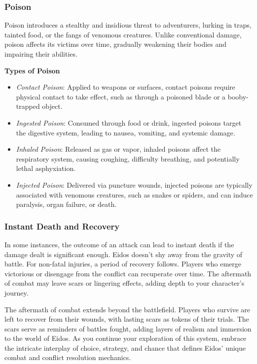 \hypertarget{poison}{%
\subsubsection{Poison}\label{poison}}

Poison introduces a stealthy and insidious threat to adventurers,
lurking in traps, tainted food, or the fangs of venomous creatures.
Unlike conventional damage, poison affects its victims over time,
gradually weakening their bodies and impairing their abilities.

\textbf{Types of Poison}

\begin{itemize}
\tightlist
\item
  \emph{Contact Poison}: Applied to weapons or surfaces, contact poisons
  require physical contact to take effect, such as through a poisoned
  blade or a booby-trapped object.
\item
  \emph{Ingested Poison}: Consumed through food or drink, ingested
  poisons target the digestive system, leading to nausea, vomiting, and
  systemic damage.
\item
  \emph{Inhaled Poison}: Released as gas or vapor, inhaled poisons
  affect the respiratory system, causing coughing, difficulty breathing,
  and potentially lethal asphyxiation.
\item
  \emph{Injected Poison}: Delivered via puncture wounds, injected
  poisons are typically associated with venomous creatures, such as
  snakes or spiders, and can induce paralysis, organ failure, or death.
\end{itemize}

\hypertarget{instant-death-and-recovery}{%
\subsubsection{Instant Death and
Recovery}\label{instant-death-and-recovery}}

In some instances, the outcome of an attack can lead to instant death if
the damage dealt is significant enough. Eidos doesn't shy away from the
gravity of battle. For non-fatal injuries, a period of recovery follows.
Players who emerge victorious or disengage from the conflict can
recuperate over time. The aftermath of combat may leave scars or
lingering effects, adding depth to your character's journey.

The aftermath of combat extends beyond the battlefield. Players who
survive are left to recover from their wounds, with lasting scars as
tokens of their trials. The scars serve as reminders of battles fought,
adding layers of realism and immersion to the world of Eidos. As you
continue your exploration of this system, embrace the intricate
interplay of choice, strategy, and chance that defines Eidos' unique
combat and conflict resolution mechanics.


